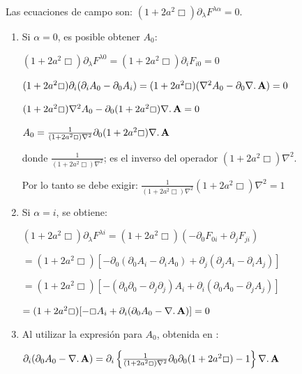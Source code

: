 \documentclass[a4paper,12pt]{article}
\begin{document}
Las ecuaciones de campo son: $(1+2a^2\Box)\partial_{\lambda}F^{\lambda\alpha}=0$.
\begin{enumerate}
\item [\fbox{1.}] Si $\alpha=0$, es posible obtener $A_0$:
\vspace{0,1cm}

$(1+2a^2\Box)\partial_{\lambda}F^{\lambda0}=(1+2a^2\Box)\partial_{i}F_{i0}=0$ 
\vspace{0,1cm}

$(1+2a^2\Box)\partial_{i}(\partial_{i}A_0-\partial_{0}A_i)=(1+2a^2\Box)(\nabla^2A_0-\partial_{0}\nabla\ldotp {\bf A})=0$
\vspace{0,1cm}

$(1+2a^2\Box)\nabla^2A_0-\partial_{0}(1+2a^2\Box)\nabla\ldotp {\bf A}=0$
\vspace{0,1cm}

$A_0=\frac{1}{(1+2a^2\Box)\nabla^2}\partial_{0}(1+2a^2\Box)\nabla\ldotp {\bf A}$
\vspace{0,1cm}

donde $\frac{1}{(1+2a^2\Box)\nabla^2}$; es el inverso del operador $(1+2a^2\Box)\nabla^2$. 
\vspace{0,1cm}

Por lo tanto se debe exigir: $\frac{1}{(1+2a^2\Box)\nabla^2}(1+2a^2\Box)\nabla^2=1$
\item [\fbox{2.}] Si $\alpha=i$, se obtiene:
\vspace{0,1cm}

$(1+2a^2\Box)\partial_{\lambda}F^{\lambda i}=(1+2a^2\Box)(-\partial_{0}F_{0i}+\partial_{j}F_{ji})$
\vspace{0,1cm}

$=(1+2a^2\Box)[-\partial_{0}(\partial_{0}A_i-\partial_{i}A_0)+\partial_{j}(\partial_{j}A_i-\partial_{i}A_j)]$
\vspace{0,1cm}

$=(1+2a^2\Box)[-(\partial_{0}\partial_{0}-\partial_{j}\partial_{j})A_i+\partial_{i}(\partial_{0}A_0-\partial_{j}A_j)]$
\vspace{0,1cm}

$=(1+2a^2\Box)[-\Box A_i+\partial_{i}(\partial_{0}A_0-\nabla\ldotp {\bf A})]=0$
\item [\fbox{3.}] Al utilizar la expresión para $A_0$, obtenida en :
\vspace{0,1cm} 

$\partial_{i}(\partial_{0}A_0-\nabla\ldotp {\bf A})=\partial_{i}\left\{\frac{1}{(1+2a^2\Box)\nabla^2}\partial_{0}\partial_{0}(1+2a^2\Box)-1\right\}\nabla\ldotp {\bf A}$
\vspace{0,1cm}


\end{enumerate}
\end{document}
